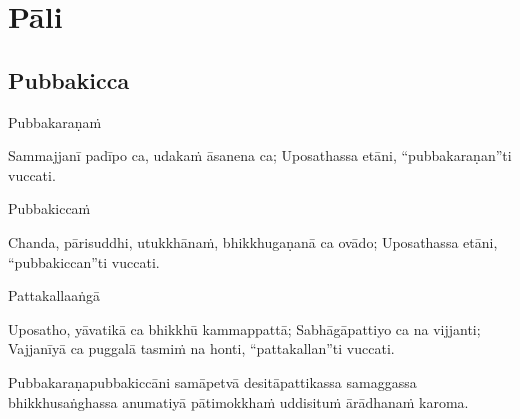 
\chapter{Pāli}

\clearpage

\section{Pubbakicca}
\label{pubbakicca}

Pubbakaraṇaṁ

Sammajjanī padīpo ca, udakaṁ āsanena ca;
Uposathassa etāni, “pubbakaraṇan''ti vuccati.

Pubbakiccaṁ

Chanda, pārisuddhi, utukkhānaṁ, bhikkhugaṇanā ca ovādo;
Uposathassa etāni, “pubbakiccan''ti vuccati.

Pattakallaaṅgā

Uposatho, yāvatikā ca bhikkhū kammappattā;
Sabhāgāpattiyo ca na vijjanti;
Vajjanīyā ca puggalā tasmiṁ na honti, “pattakallan''ti vuccati.

Pubbakaraṇapubbakiccāni samāpetvā desitāpattikassa samaggassa bhikkhusaṅghassa anumatiyā pātimokkhaṁ uddisituṁ ārādhanaṁ karoma.

\clearpage

